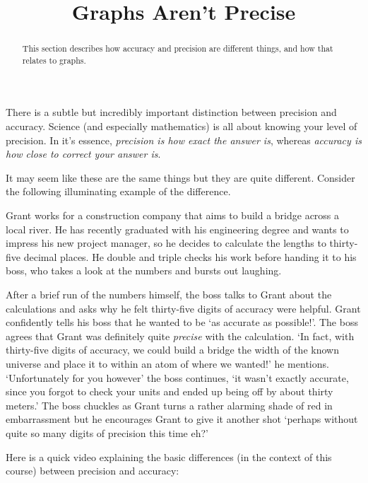 \documentclass{ximera}
\title{Graphs Aren't Precise}
\begin{document}
\begin{abstract}
    This section describes how accuracy and precision are different things, and how that relates to graphs.
\end{abstract}
\maketitle

    There is a subtle but incredibly important distinction between precision and accuracy. Science (and especially mathematics) is all about knowing your level of precision. In it's essence, \textit{precision is how exact the answer is}, whereas \textit{accuracy is how close to correct your answer is}.
    
    It may seem like these are the same things but they are quite different. Consider the following illuminating example of the difference.
    
    \begin{explanation}%
        Grant works for a construction company that aims to build a bridge across a local river. He has recently graduated with his engineering degree and wants to impress his new project manager, so he decides to calculate the lengths to thirty-five decimal places. He double and triple checks his work before handing it to his boss, who takes a look at the numbers and bursts out laughing.
        
        After a brief run of the numbers himself, the boss talks to Grant about the calculations and asks why he felt thirty-five digits of accuracy were helpful. Grant confidently tells his boss that he wanted to be `as accurate as possible!'. The boss agrees that Grant was definitely quite \textit{precise} with the calculation. `In fact, with thirty-five digits of accuracy, we could build a bridge the width of the known universe and place it to within an atom of where we wanted!' he mentions. `Unfortunately for you however' the boss continues, `it wasn't exactly accurate, since you forgot to check your units and ended up being off by about thirty meters.' The boss chuckles as Grant turns a rather alarming shade of red in embarrassment but he encourages Grant to give it another shot `perhaps without quite so many digits of precision this time eh?'   
    \end{explanation}
    
    
    Here is a quick video explaining the basic differences (in the context of this course) between precision and accuracy:
    
\end{document}
